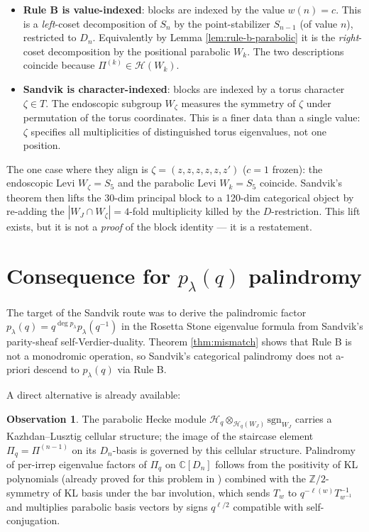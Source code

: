 \documentclass[11pt]{article}
\theoremstyle{definition}
\newtheorem{observation}[theorem]{Observation}
\begin{document}
\begin{itemize}
\item \textbf{Rule B is value-indexed}: blocks are indexed by the value $w(n) = c$. This
is a \emph{left}-coset decomposition of $S_n$ by the point-stabilizer $S_{n-1}$ (of
value $n$), restricted to $D_n$. Equivalently by Lemma \ref{lem:rule-b-parabolic} it
is the \emph{right}-coset decomposition by the positional parabolic $W_k$. The two
descriptions coincide because $\Pi^{(k)} \in \mathcal{H}(W_k)$.

\item \textbf{Sandvik is character-indexed}: blocks are indexed by a torus character
$\zeta \in T$. The endoscopic subgroup $W_\zeta$ measures the symmetry of $\zeta$
under permutation of the torus coordinates. This is a finer data than a single value:
$\zeta$ specifies all multiplicities of distinguished torus eigenvalues, not one
position.
\end{itemize}

The one case where they align is $\zeta = (z, z, z, z, z, z')$ ($c=1$ frozen): the
endoscopic Levi $W_\zeta = S_5$ and the parabolic Levi $W_k = S_5$ coincide. Sandvik's
theorem then lifts the 30-dim principal block to a 120-dim categorical object by
re-adding the $|W_J \cap W_\zeta| = 4$-fold multiplicity killed by the $D$-restriction.
This lift exists, but it is not a \emph{proof} of the block identity — it is a
restatement.

\section{Consequence for $p_\lambda(q)$ palindromy}

The target of the Sandvik route was to derive the palindromic factor
$p_\lambda(q) = q^{\deg p_\lambda} p_\lambda(q^{-1})$ in the Rosetta Stone
eigenvalue formula from Sandvik's parity-sheaf self-Verdier-duality. Theorem
\ref{thm:mismatch} shows that Rule B is not a monodromic operation, so Sandvik's
categorical palindromy does not a-priori descend to $p_\lambda(q)$ via Rule B.

A direct alternative is already available:
\begin{observation}\label{obs:kl-route}
The parabolic Hecke module $\mathcal{H}_q \otimes_{\mathcal{H}_q(W_J)} \mathrm{sgn}_{W_J}$
carries a Kazhdan--Lusztig cellular structure; the image of the staircase element
$\Pi_q = \Pi^{(n-1)}$ on its $D_n$-basis is governed by this cellular structure.
Palindromy of per-irrep eigenvalue factors of $\Pi_q$ on $\mathbb{C}[D_n]$ follows
from the positivity of KL polynomials (already proved for this problem in
\cite{memory:eigenvalue-positivity-proved}) combined with the
$\mathbb{Z}/2$-symmetry of KL basis under the bar involution, which sends $T_w$ to
$q^{-\ell(w)} T_{w^{-1}}^{-1}$ and multiplies parabolic basis vectors by signs
$q^{\ell/2}$ compatible with self-conjugation.
\end{observation}
\end{document}
